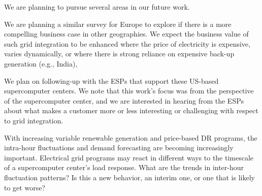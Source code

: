 We are planning to pursue several areas in our future work.

We are planning a similar survey for Europe to explore if there is a more compelling business case 
in other geographies.
We expect the business value of such grid integration to be enhanced where the price of 
electricity is expensive, varies dynamically, or where there is strong reliance on expensive back-up 
generation (e.g., India),   

We plan on following-up with the ESPs that support these US-based supercomputer 
centers. We note that this work's focus was from the perspective of the supercomputer center, and 
we are interested in hearing from the ESPs about what makes a customer more or less interesting or 
challenging with respect to grid integration.

With increasing variable renewable generation and price-based DR programs, the intra-hour fluctuations 
and demand forecasting are becoming increasingly important. 
Electrical grid programs may react in different ways to the timescale of a supercomputer center's load response.
What are the trends 
in inter-hour fluctuation patterns?  Is this a new behavior, an interim one, or one that is likely to get worse?  



